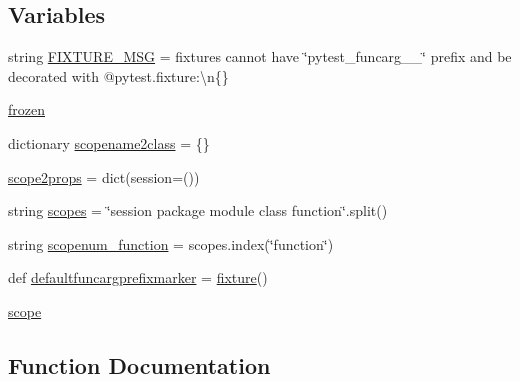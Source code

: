 \subsection*{Variables}
\begin{DoxyCompactItemize}
\item 
string \hyperlink{namespace__pytest_1_1fixtures_a88653bd907ec73d3cfd6dc4c6c9928fe}{F\+I\+X\+T\+U\+R\+E\+\_\+\+M\+SG} = \textquotesingle{}fixtures cannot have \char`\"{}pytest\+\_\+funcarg\+\_\+\+\_\+\char`\"{} prefix and be decorated with @pytest.\+fixture\+:\textbackslash{}n\{\}\textquotesingle{}
\item 
\hyperlink{namespace__pytest_1_1fixtures_af250e366ef9bfe4ef3e2074295296f9e}{frozen}
\item 
dictionary \hyperlink{namespace__pytest_1_1fixtures_a7c2b0c124a04d5ff761ba4c7df24799a}{scopename2class} = \{\}
\item 
\hyperlink{namespace__pytest_1_1fixtures_ac4b7be2ab4a0289ebecd81bbdaeabccd}{scope2props} = dict(session=())
\item 
string \hyperlink{namespace__pytest_1_1fixtures_a5015c1644820a9b78acf9d3466b0d57e}{scopes} = \char`\"{}session package module class function\char`\"{}.split()
\item 
string \hyperlink{namespace__pytest_1_1fixtures_aeaedc5d547d078e5e81f0344ea8b023c}{scopenum\+\_\+function} = scopes.\+index(\char`\"{}function\char`\"{})
\item 
def \hyperlink{namespace__pytest_1_1fixtures_a865b6418bbc806ac46031a25f5021f77}{defaultfuncargprefixmarker} = \hyperlink{namespace__pytest_1_1fixtures_a7f10df0ff0d8d2c5e29e89f022c59d15}{fixture}()
\item 
\hyperlink{namespace__pytest_1_1fixtures_a13dd74c58426e1e7d1f13069b3caffee}{scope}
\end{DoxyCompactItemize}


\subsection{Function Documentation}
\mbox{\label{namespace__pytest_1_1fixtures_af889cb5dc2338f176beed2d20c138fb0}} 
